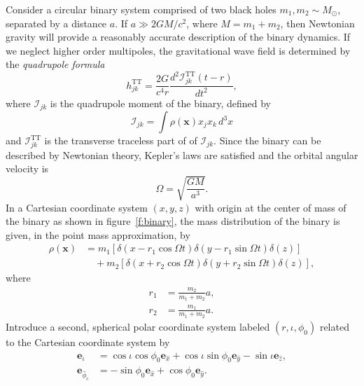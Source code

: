 Consider a circular binary system comprised of two black holes $m_1, m_2 \sim
M_\odot$, separated by a distance $a$. If $a \gg 2GM/c^2$, where $M = m_1 +
m_2$, then Newtonian gravity will provide a reasonably accurate description of
the binary dynamics.  If we neglect higher order multipoles, the gravitational
wave field is determined by the \emph{quadrupole formula}\cite{MTW73}
\begin{equation}
h_{jk}^\mathrm{TT} = 
\frac{2G}{c^4r} \frac{d^2 \mathcal{I}_{jk}^\mathrm{TT}(t - r)}{dt^2},
\label{eq:quadrupole}
\end{equation}
where $\mathcal{I}_{jk}$ is the quadrupole moment of the binary, defined by
\begin{equation}
\mathcal{I}_{jk} =
\int \rho(\boldsymbol{x})x_j x_k\,d^3 x
\label{eq:massquad}
\end{equation}
and $\mathcal{I}_{jk}^\mathrm{TT}$ is the transverse traceless part of of
$\mathcal{I}_{jk}$. Since the binary can be described by Newtonian theory,
Kepler's laws are satisfied and the orbital angular velocity is
\begin{equation}
\Omega = \sqrt{\frac{GM}{a^3}}.
\end{equation}
In a Cartesian coordinate system $(x,y,z)$ with origin at
the center of mass of the binary as shown in figure~\ref{f:binary},
the mass distribution of the binary is given, in the point mass approximation,
by
\begin{equation}
\begin{split}
\rho(\boldsymbol{x}) &=
m_1\left[\delta(x - r_1 \cos\Omega t) \delta(y - r_1 \sin\Omega
t)\delta(z)\right] \\
&\quad +
m_2\left[\delta(x + r_2 \cos\Omega t) \delta(y + r_2 \sin\Omega
t)\delta(z)\right],
\label{eq:binarymassdist}
\end{split}
\end{equation}
where
\begin{align}
r_1 &= \frac{m_2}{m_1 + m_2} a, \\
r_2 &= \frac{m_1}{m_1 + m_2} a.
\end{align}
Introduce a second, spherical polar coordinate system labeled
$(r,\iota,\phi_0)$ related to the Cartesian coordinate system by
\begin{align}
\boldsymbol{e}_{\hat{\iota}} &= 
\cos \iota \cos \phi_0 \boldsymbol{e}_{\hat{x}} 
+ \cos \iota \sin \phi_0 \boldsymbol{e}_{\hat{y}} 
- \sin \iota \boldsymbol{e}_{\hat{z}}, \\
\boldsymbol{e}_{\hat{\phi}_c} &= 
- \sin \phi_0 \boldsymbol{e}_{\hat{x}} 
+ \cos \phi_0 \boldsymbol{e}_{\hat{y}}.
\end{align}
